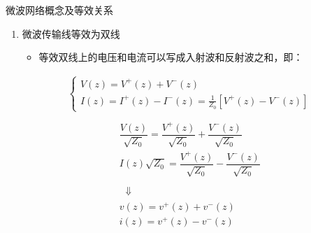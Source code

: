 \begin{frame}{微波网络概念及等效关系}
    \begin{enumerate}
        \item 微波传输线等效为双线
              \begin{itemize}
                  \item 等效双线上的电压和电流可以写成入射波和反射波之和，即：
              \end{itemize}
              \begin{gather*}
                  \begin{cases}
                      V(z)=V^{+}(z)+V^{-}(z) \\
                      I(z)=I^{+}(z)-I^{-}(z)=\frac{1}{Z_0}[V^{+}(z)-V^{-}(z)]
                  \end{cases}
              \end{gather*}
              \begin{gather*}                                                                                                              \\
                  \begin{matrix*}
                      \dfrac{V(z)}{\sqrt{Z_0}}=\dfrac{V^{+}(z)}{\sqrt{Z_0}}+\dfrac{V^{-}(z)}{\sqrt{Z_0}}\\
                      I(z)\sqrt{Z_0}=\dfrac{V^{+}(z)}{\sqrt{Z_0}}-\dfrac{V^{-}(z)}{\sqrt{Z_0}}\\
                  \end{matrix*} \\
                  \quad\Downarrow\quad                                                                                                                                            \\
                  \begin{matrix*}
                      v(z)=v^{+}(z)+v^{-}(z)\\
                      i(z)=v^{+}(z)-v^{-}(z)\\
                  \end{matrix*}
              \end{gather*}
    \end{enumerate}
\end{frame}

